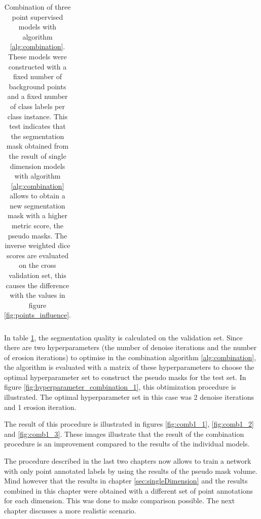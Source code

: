 \begin{table}
\begin{tabular}{l|lll}
        \end{tabular}
    \caption{Combination of three point supervised models with algorithm \ref{alg:combination}. 
    These models were constructed with a fixed number of background points and a fixed number of class labels per class instance.
    This test indicates that the segmentation mask obtained from the result of single dimension models with algorithm \ref{alg:combination} allows to obtain a new segmentation mask with a higher metric score, the pseudo masks.
    The inverse weighted dice scores are evaluated on the cross validation set, this causes the difference with the values in figure \ref{fig:points_influence}. \label{tab:combination_1}
    }

\end{table}
\par{
    In table \ref{tab:combination_1}, the segmentation quality is calculated on the validation set.
    Since there are two hyperparameters (the number of denoise iterations and the number of erosion iterations) to optimise in the combination algorithm \ref{alg:combination}, 
    the algorithm is evaluated with a matrix of these hyperparameters to choose the optimal hyperparameter set to construct the pseudo masks for the test set.
    In figure \ref{fig:hyperparameter_combination_1}, this obtimization procedure is illustrated.
    The optimal hyperparameter set in this case was 2 denoise iterations and 1 erosion iteration.
}
\par{
    The result of this procedure is illustrated in figures \ref{fig:comb1_1}, \ref{fig:comb1_2} and \ref{fig:comb1_3}.
    These images illustrate that the result of the combination procedure is an improvement compared to the results of the individual models.
}   
\par{
    The procedure described in the last two chapters now allows to train a network with only point annotated labels by using the results of the pseudo mask volume.
    Mind however that the results in chapter \ref{sec:singleDimension} and the results combined in this chapter were obtained with a different set of point annotations for each dimension.
    This was done to make comparison possible. The next chapter discusses a more realistic scenario.
}

